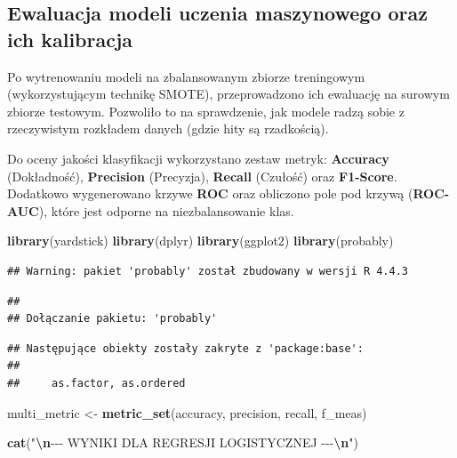 \documentclass[
]{article}
\newenvironment{Shaded}{\begin{snugshade}}{\end{snugshade}}
\newcommand{\FunctionTok}[1]{\textcolor[rgb]{0.13,0.29,0.53}{\textbf{#1}}}
\newcommand{\NormalTok}[1]{#1}
\newcommand{\OtherTok}[1]{\textcolor[rgb]{0.56,0.35,0.01}{#1}}
\newcommand{\SpecialCharTok}[1]{\textcolor[rgb]{0.81,0.36,0.00}{\textbf{#1}}}
\newcommand{\StringTok}[1]{\textcolor[rgb]{0.31,0.60,0.02}{#1}}
\begin{document}
\subsection{Ewaluacja modeli uczenia maszynowego oraz ich
kalibracja}\label{ewaluacja-modeli-uczenia-maszynowego-oraz-ich-kalibracja}

Po wytrenowaniu modeli na zbalansowanym zbiorze treningowym
(wykorzystującym technikę SMOTE), przeprowadzono ich ewaluację na
surowym zbiorze testowym. Pozwoliło to na sprawdzenie, jak modele radzą
sobie z rzeczywistym rozkładem danych (gdzie hity są rzadkością).

Do oceny jakości klasyfikacji wykorzystano zestaw metryk:
\textbf{Accuracy} (Dokładność), \textbf{Precision} (Precyzja),
\textbf{Recall} (Czułość) oraz \textbf{F1-Score}. Dodatkowo wygenerowano
krzywe \textbf{ROC} oraz obliczono pole pod krzywą (\textbf{ROC-AUC}),
które jest odporne na niezbalansowanie klas.

\begin{Shaded}
\begin{Highlighting}[]
\FunctionTok{library}\NormalTok{(yardstick)}
\FunctionTok{library}\NormalTok{(dplyr)}
\FunctionTok{library}\NormalTok{(ggplot2)}
\FunctionTok{library}\NormalTok{(probably)}
\end{Highlighting}
\end{Shaded}

\begin{verbatim}
## Warning: pakiet 'probably' został zbudowany w wersji R 4.4.3
\end{verbatim}

\begin{verbatim}
## 
## Dołączanie pakietu: 'probably'
\end{verbatim}

\begin{verbatim}
## Następujące obiekty zostały zakryte z 'package:base':
## 
##     as.factor, as.ordered
\end{verbatim}

\begin{Shaded}
\begin{Highlighting}[]
\NormalTok{multi\_metric }\OtherTok{\textless{}{-}} \FunctionTok{metric\_set}\NormalTok{(accuracy, precision, recall, f\_meas)}

\FunctionTok{cat}\NormalTok{(}\StringTok{"}\SpecialCharTok{\textbackslash{}n}\StringTok{{-}{-}{-} WYNIKI DLA REGRESJI LOGISTYCZNEJ {-}{-}{-}}\SpecialCharTok{\textbackslash{}n}\StringTok{"}\NormalTok{)}
\end{Highlighting}
\end{Shaded}
\end{document}
